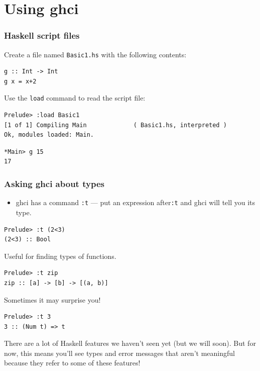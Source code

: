 \documentclass{beamer}
\begin{document}
\section{Using ghci}

\begin{frame}[fragile]
\frametitle{Haskell script files}

Create a file named {\tt Basic1.hs} with the following contents:

%
\begin{verbatim}
g :: Int -> Int
g x = x+2
\end{verbatim}

Use the {\tt load} command to read the script file:

{\footnotesize
\begin{verbatim}
Prelude> :load Basic1
[1 of 1] Compiling Main             ( Basic1.hs, interpreted )
Ok, modules loaded: Main.
\end{verbatim}
}

\begin{verbatim}
*Main> g 15
17
\end{verbatim}

\end{frame}

\begin{frame}[fragile]
\frametitle{Asking ghci about types}

\begin{itemize}
\item ghci has a command {\tt :t} --- put an expression after{\tt :t}  and
  ghci will tell you its type.
\end{itemize}

\begin{verbatim}
Prelude> :t (2<3)
(2<3) :: Bool
\end{verbatim}

Useful for finding types of functions.

\begin{verbatim}
Prelude> :t zip
zip :: [a] -> [b] -> [(a, b)]
\end{verbatim}

Sometimes it may surprise you!

\begin{verbatim}
Prelude> :t 3
3 :: (Num t) => t
\end{verbatim}

{\redtext There are a lot of Haskell features we haven't seen yet
  (but we will soon).  But for now, this means you'll see types and
  error messages that aren't meaningful because they refer to some
  of these features!}

\end{frame}
\end{document}
